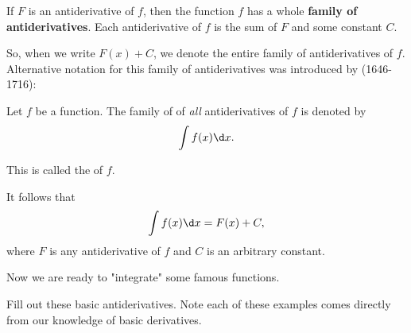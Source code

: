 \documentclass{ximera}
\begin{document}
\begin{theorem}\label{theorem:FOA}

If $F$ is an antiderivative of $f$, then the function $f$ has a whole \textbf{family of antiderivatives}. Each antiderivative of $f$ is the sum of $F$ and some constant $C$.
\end{theorem}

So, when we write $F(x)+C$, we denote the entire family of
antiderivatives of $f$.  Alternative notation for this family of
antiderivatives was introduced by  (1646-1716):
 
\begin{definition}
Let $f$ be a function. The family of of \emph{all} antiderivatives of $f$ is denoted by
\[
\int f(x) \d x. 
\]

This is called the
 of $f$.
\end{definition}
It follows that
\[
\int f(x) \d x =F(x)+C,
\]
where $F$ is any antiderivative of $f$ and $C$ is an arbitrary constant.

Now we are ready to "integrate" some famous functions.


Fill out these basic antiderivatives. Note each of these examples comes
directly from our knowledge of basic derivatives.
\end{document}
